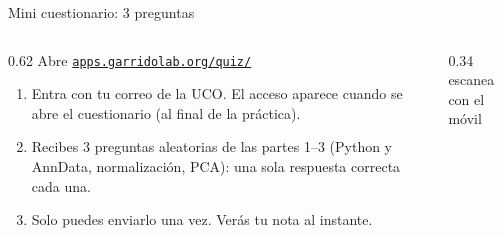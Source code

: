 \documentclass[aspectratio=169,10pt]{beamer}
\begin{document}
\begin{frame}{Mini cuestionario: 3 preguntas}
  \begin{columns}[T]
    \begin{column}{0.62\textwidth}
      \large Abre \href{https://apps.garridolab.org/quiz/}{\alert{\texttt{apps.garridolab.org/quiz/}}}
      \normalsize\vspace{0.3cm}

      \begin{enumerate}\setlength\itemsep{6pt}
        \item Entra con tu \alert{correo de la UCO}. El acceso aparece cuando se abre el cuestionario (al final de la práctica).
        \item Recibes \alert{3 preguntas aleatorias} de las partes 1--3 (Python y AnnData, normalización, PCA): una sola respuesta correcta cada una.
        \item Solo puedes enviarlo \alert{una vez}. Verás tu nota al instante.
      \end{enumerate}
    \end{column}
    \begin{column}{0.34\textwidth}
      \centering
      \\[4pt]
      \scriptsize escanea con el móvil
    \end{column}
  \end{columns}
\end{frame}
\end{document}
